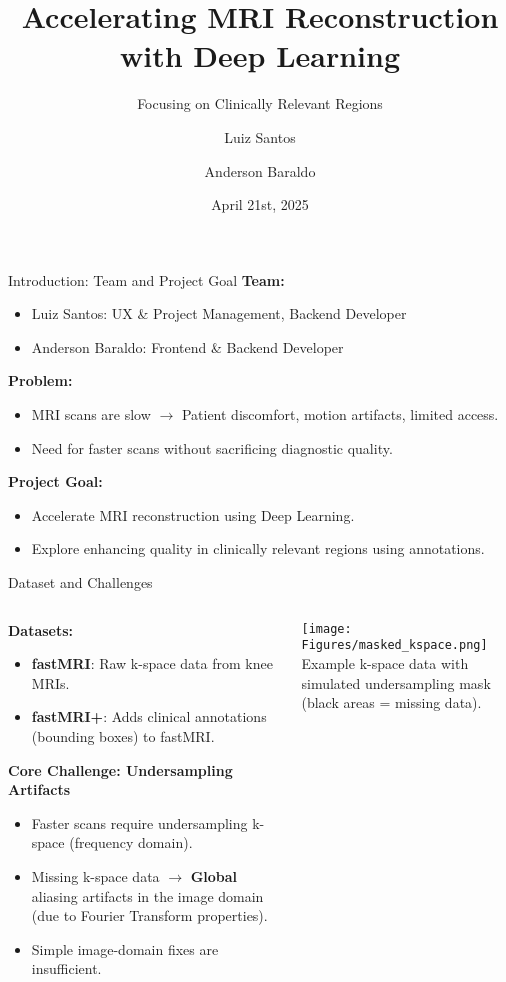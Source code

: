\documentclass{beamer}
\title[MRI Reconstruction Acceleration]{Accelerating MRI Reconstruction with Deep Learning}
\subtitle{Focusing on Clinically Relevant Regions}
\author[Santos \& Baraldo]{Luiz Santos \and Anderson Baraldo}
\institute[Gatech - CS 6440]{Georgia Institute of Technology \\ CS 6440}
\date{April 21st, 2025}
\begin{document}
\begin{frame}
  \titlepage
\end{frame}

\begin{frame}{Introduction: Team and Project Goal}
  \textbf{Team:}
  \begin{itemize}
    \item Luiz Santos: UX \& Project Management, Backend Developer
    \item Anderson Baraldo: Frontend \& Backend Developer
  \end{itemize}
  \vfill
  \textbf{Problem:}
  \begin{itemize}
    \item MRI scans are slow $\rightarrow$ Patient discomfort, motion artifacts, limited access.
    \item Need for faster scans without sacrificing diagnostic quality.
  \end{itemize}
  \vfill
  \textbf{Project Goal:}
  \begin{itemize}
    \item Accelerate MRI reconstruction using Deep Learning.
    \item Explore enhancing quality in clinically relevant regions using annotations.
  \end{itemize}
\end{frame}

\begin{frame}{Dataset and Challenges}
  \begin{columns}[T]
    \begin{column}{0.65\textwidth}
      \textbf{Datasets:}
      \begin{itemize}
        \item \textbf{fastMRI}: Raw k-space data from knee MRIs.
        \item \textbf{fastMRI+}: Adds clinical annotations (bounding boxes) to fastMRI.
      \end{itemize}
      \textbf{Core Challenge: Undersampling Artifacts}
      \begin{itemize}
        \item Faster scans require undersampling k-space (frequency domain).
        \item Missing k-space data $\rightarrow$ \textbf{Global} aliasing artifacts in the image domain (due to Fourier Transform properties).
        \item Simple image-domain fixes are insufficient.
      \end{itemize}
    \end{column}
    \begin{column}{0.35\textwidth}
      \centering
      \texttt{[image: Figures/masked\_kspace.png]} \\
      \vspace{1mm}
      \tiny Example k-space data with simulated undersampling mask (black areas = missing data).
    \end{column}
  \end{columns}
\end{frame}
\end{document}
